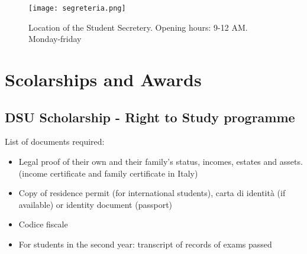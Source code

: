 \documentclass[11pt,fleqn,oneside]{book} %
\begin{document}
\begin{figure}[h]
    \centering\texttt{[image: segreteria.png]}
    \caption{Location of the Student Secretery. Opening hours: 9-12 AM. Monday-friday}
\end{figure}



\chapter{Scolarships and Awards}


\section{DSU Scholarship - Right to Study programme}

List of documents required:

\begin{itemize}
		\item Legal proof of their own and their family’s status, incomes, estates and assets. (income certificate and family certificate in Italy)
		\item Copy of residence permit (for international students), carta di identità (if available) or identity document (passport)
		\item Codice fiscale
		\item For students in the second year: transcript of records of exams passed
\end{itemize}
\end{document}
